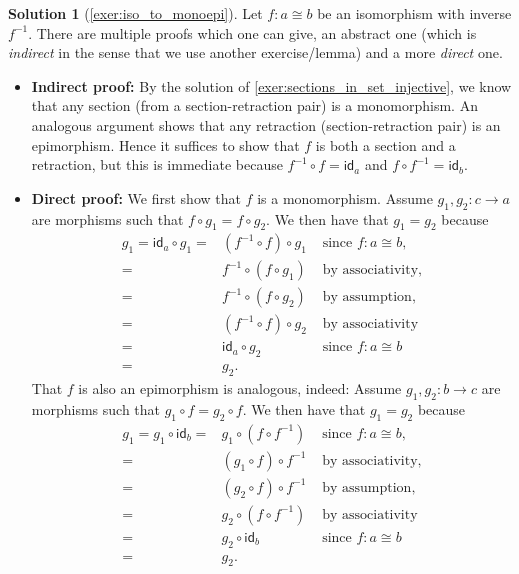 \documentclass[a4paper,11pt, oneside,titlepage=false]{scrbook}
\theoremstyle{plain}
\theoremstyle{definition}
\newtheorem{solution}[thm]{Solution}
\newcommand{\cfont}[1]{\ensuremath{\mathsf{#1}}}
\newcommand{\Id}[1][]{\cfont{id}_{#1}}
\newcommand{\co}[2]{\ensuremath{#2 \circ #1}}
\begin{document}
\begin{solution}[\cref{exer:iso_to_monoepi}]\label{sol:iso_to_monoepi}
Let $f : a\cong b$ be an isomorphism with inverse $f^{-1}$. There are multiple proofs which one can give, an abstract one (which is \textit{indirect} in the sense that we use another exercise/lemma) and a more \textit{direct} one.
\begin{itemize}
\item \textbf{Indirect proof:} By the solution of \ref{exer:sections_in_set_injective}, we know that any section (from a section-retraction pair) is a monomorphism. An analogous argument shows that any retraction (section-retraction pair) is an epimorphism. Hence it suffices to show that $f$ is both a section and a retraction, but this is immediate because $\co{f}{f^{-1}} = \Id[a]$ and $\co{f^{-1}}{f} = \Id[b]$.
\item \textbf{Direct proof:} We first show that $f$ is a monomorphism. Assume $g_1,g_2 : c\to a$ are morphisms such that $\co{g_1}{f} = \co{g_2}{f}$. We then have that $g_1 = g_2$ because
\begin{eqnarray*}
g_1 = \co{g_1}{\Id[a]} =& \co{g_1}{(\co{f}{f^{-1}})} & \text{ since $f : a\cong b$},\\
	=& \co{(\co{g_1}{f})}{f^{-1}} & \text{ by associativity}, \\
	=& \co{(\co{g_2}{f})}{f^{-1}} & \text{ by assumption}, \\
	=& \co{g_2}{(\co{f}{f^{-1}})} & \text{ by associativity} \\
	=& \co{g_2}{\Id[a]} & \text{ since $f : a\cong b$} \\
	=& g_2.
\end{eqnarray*}
That $f$ is also an epimorphism is analogous, indeed: Assume $g_1,g_2 : b\to c$ are morphisms such that $\co{f}{g_1} = \co{f}{g_2}$. We then have that $g_1 = g_2$ because
\begin{eqnarray*}
g_1 = \co{\Id[b]}{g_1} =& \co{(\co{f^{-1}}{f})}{g_1} & \text{ since $f : a\cong b$},\\
	=& \co{f^{-1}}{(\co{f}{g_1})} & \text{ by associativity}, \\
	=& \co{f^{-1}}{(\co{f}{g_2})} & \text{ by assumption}, \\
	=& \co{(\co{f^{-1}}{f})}{g_2} & \text{ by associativity} \\
	=& \co{\Id[b]}{g_2} & \text{ since $f : a\cong b$} \\
	=& g_2.
\end{eqnarray*}
\end{itemize}
\end{solution}
\end{document}

